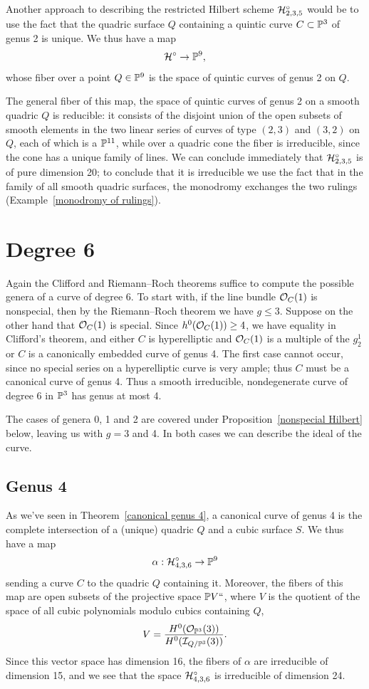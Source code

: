 Another approach to describing the restricted Hilbert scheme
$\cH^\circ_{2,3,5}$ would be to use the fact that the quadric surface $Q$
containing a quintic curve $C \subset \PP^3$ of genus 2 is unique. We
thus have a map
$$
\cH^\circ \to \PP^9,
$$
whose fiber over a point $Q \in \PP^9$ is the space of quintic curves
of genus 2 on $Q$.

The general fiber of this map, the space of quintic curves of genus 2 on a
smooth quadric $Q$ is  reducible: it consists of the disjoint union of the
open subsets of smooth elements in the two linear series of curves of type
$(2,3)$ and $(3,2)$ on $Q$, each of which is a $\PP^{11}$, while over a
quadric cone the fiber is irreducible, since the cone has a unique
family of lines.  We can conclude immediately that $\cH^\circ_{2,3,5}$
is of pure dimension 20; to conclude that it is irreducible we use the
fact that in the family of all smooth quadric surfaces, the
monodromy
%
exchanges the two rulings (Example~\ref{monodromy of rulings}).

\section{Degree 6}

Again the Clifford and Riemann--Roch theorems suffice to compute the
possible genera of a curve of degree 6. To start with,  if the line bundle
$\cO_C(1)$ is nonspecial, then by the Riemann--Roch theorem we have $g
\leq 3$. Suppose on the other hand that $\cO_C(1)$ is special. Since
$h^{0}(\cO_C(1)) \geq 4$, we have equality in Clifford's theorem,
and either $C$ is hyperelliptic and $\cO_C(1)$ is a multiple of the
$g^{1}_{2}$ or  $C$ is  a canonically embedded curve of genus 4. The
first case cannot occur, since no special series on a hyperelliptic
curve is very ample; thus $C$ must be a canonical curve
%
of genus 4. Thus
%
a smooth irreducible, nondegenerate curve of degree 6 in $\PP^3$ has
genus at most 4.

The cases of genera 0, 1 and 2 are covered under
Proposition~\ref{nonspecial Hilbert} below, leaving us 
with
$g =
3$ and 4. In both cases we can describe the ideal of the curve.

\subsection*{Genus 4}

As we've seen in
Theorem~\ref{canonical genus 4},
a canonical curve of genus 4 is the complete intersection of a (unique)
quadric $Q$ and a cubic surface $S$. We thus have a map
$$
\alpha : \cH^\circ_{4,3,6} \to \PP^9
$$
sending a curve $C$ to the quadric $Q$ containing it. Moreover, the
%
fibers of this map are open subsets of the projective space $\PP V` `$,
where $V$ is the quotient of the space of all cubic polynomials modulo
cubics containing $Q$,
$$
V = \frac{H^0(\cO_{\PP^3}(3))}{H^0(\cI_{Q/\PP^3}(3))}.
$$
Since this vector space has dimension 16, the fibers of $\alpha$
are irreducible of dimension 15, and we 
see
that the space
$\cH^\circ_{4,3,6}$ is irreducible of dimension 24.

